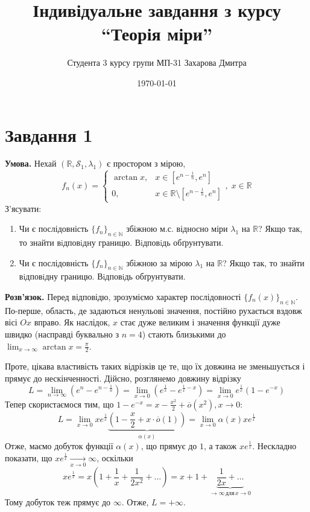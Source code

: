 \documentclass[14pt]{extarticle}
\title{Індивідуальне завдання з курсу ``Теорія міри''}
\author{Студента 3 курсу групи МП-31 Захарова Дмитра}
\date{\today}
\begin{document}
\maketitle

\section*{Завдання 1}

\textbf{Умова.} Нехай $(\mathbb{R},\mathcal{S}_1,\lambda_1)$ є простором з мірою,
\[
f_n(x) = \begin{cases}
    \arctan x, & x \in [e^{n-\frac{1}{n}},e^n] \\
    0, & x \in \mathbb{R} \setminus [e^{n-\frac{1}{n}},e^n]
\end{cases}, \; x \in \mathbb{R}
\]
З'ясувати:
\begin{enumerate}
    \item Чи є послідовність $\{f_n\}_{n \in \mathbb{N}}$ збіжною м.с. відносно міри $\lambda_1$ на $\mathbb{R}$? Якщо так, то знайти вiдповiдну границю. Вiдповiдь обґрунтувати.
    \item Чи є послідовність $\{f_n\}_{n \in \mathbb{N}}$ збіжною за мірою $\lambda_1$ на $\mathbb{R}$? Якщо так, то знайти вiдповiдну границю. Вiдповiдь обґрунтувати.
\end{enumerate}

\textbf{Розв'язок.} Перед відповідю, зрозуміємо характер послідовності $\{f_n(x)\}_{n \in \mathbb{N}}$. По-перше, область, де задаються ненульові значення, постійно рухається вздовж вісі $Ox$ вправо. Як наслідок, $x$ стає дуже великим і значення функції дуже швидко (насправді буквально з $n=4$) стають близькими до $\lim_{x \to \infty}\arctan x = \frac{\pi}{2}$. 

Проте, цікава властивість таких відрізків це те, що їх довжина не зменьшується і прямує до нескінченності. Дійсно, розглянемо довжину відрізку
\[
L=\lim_{n \to \infty}\left(e^n - e^{n-\frac{1}{n}}\right) = \lim_{x \to 0}\left(e^{\frac{1}{x}} - e^{\frac{1}{x}-x}\right) = \lim_{x \to 0} e^{\frac{1}{x}}\left(1-e^{-x}\right)
\]
Тепер скористаємося тим, що $1-e^{-x} = x - \frac{x^2}{2} + \overline{o}(x^2), x \to 0$:
\[
L = \lim_{x \to 0}xe^{\frac{1}{x}}\underbrace{\left(1 - \frac{x}{2} + x\cdot \overline{o}(1)\right)}_{\alpha(x)} = \lim_{x \to 0} \alpha(x)xe^{\frac{1}{x}}
\]
Отже, маємо добуток функції $\alpha(x)$, що прямує до $1$, а також $xe^{\frac{1}{x}}$. Нескладно показати, що $xe^{\frac{1}{x}}\xrightarrow[x\to 0]{} \infty$, оскільки 
\[
xe^{\frac{1}{x}} = x\left(1 + \frac{1}{x} + \frac{1}{2x^2} + \dots\right) = x + 1 + \underbrace{\frac{1}{2x} + \dots}_{\to \infty \, \text{для} \, x \to 0}
\]
Тому добуток теж прямує до $\infty$. Отже, $L=+\infty$. 
\end{document}
